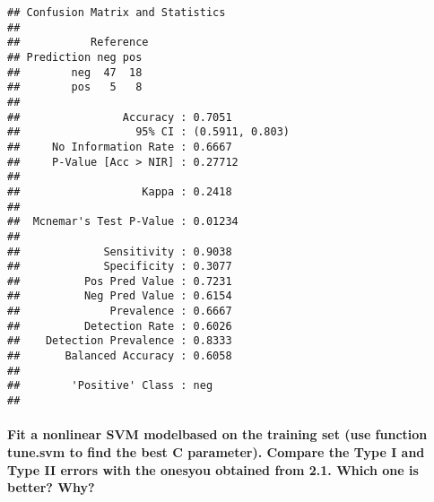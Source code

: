 \documentclass[
]{article}
\newenvironment{Shaded}{\begin{snugshade}}{\end{snugshade}}
\newcommand{\FunctionTok}[1]{\textcolor[rgb]{0.00,0.00,0.00}{#1}}
\newcommand{\NormalTok}[1]{#1}
\newcommand{\OtherTok}[1]{\textcolor[rgb]{0.56,0.35,0.01}{#1}}
\newcommand{\SpecialCharTok}[1]{\textcolor[rgb]{0.00,0.00,0.00}{#1}}
\begin{document}
\begin{Shaded}
\end{Shaded}

\begin{verbatim}
## Confusion Matrix and Statistics
## 
##           Reference
## Prediction neg pos
##        neg  47  18
##        pos   5   8
##                                          
##                Accuracy : 0.7051         
##                  95% CI : (0.5911, 0.803)
##     No Information Rate : 0.6667         
##     P-Value [Acc > NIR] : 0.27712        
##                                          
##                   Kappa : 0.2418         
##                                          
##  Mcnemar's Test P-Value : 0.01234        
##                                          
##             Sensitivity : 0.9038         
##             Specificity : 0.3077         
##          Pos Pred Value : 0.7231         
##          Neg Pred Value : 0.6154         
##              Prevalence : 0.6667         
##          Detection Rate : 0.6026         
##    Detection Prevalence : 0.8333         
##       Balanced Accuracy : 0.6058         
##                                          
##        'Positive' Class : neg            
## 
\end{verbatim}

\hypertarget{fit-a-nonlinear-svm-modelbased-on-the-training-set-use-function-tune.svm-to-find-the-best-c-parameter.-compare-the-type-i-and-type-ii-errors-with-the-onesyou-obtained-from-2.1.-which-one-is-better-why}{%
\paragraph{Fit a nonlinear SVM modelbased on the training set (use
function tune.svm to find the best C parameter). Compare the Type I and
Type II errors with the onesyou obtained from 2.1. Which one is better?
Why?}\label{fit-a-nonlinear-svm-modelbased-on-the-training-set-use-function-tune.svm-to-find-the-best-c-parameter.-compare-the-type-i-and-type-ii-errors-with-the-onesyou-obtained-from-2.1.-which-one-is-better-why}}
\end{document}
